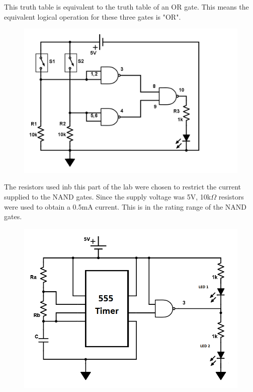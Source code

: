 \documentclass[twocolumn, amsmath]{revtex4}
\begin{document}
This truth table is equivalent to the truth table of an OR gate. This means the equivalent logical operation for these three gates is "OR".


\begin{figure}[h]
    \includegraphics[scale=0.25]{NAND.png}  
    \caption{}
\end{figure}


The resistors used inb this part of the lab were chosen to restrict the current supplied to the NAND gates. Since the supply voltage was 5V, 10k$\Omega$ resistors were used to obtain a 0.5mA current. This is in the rating range of the NAND gates. %




\begin{figure}[h]
    \includegraphics[scale=0.35]{555.png}  
    \caption{}
\end{figure}
\end{document}
